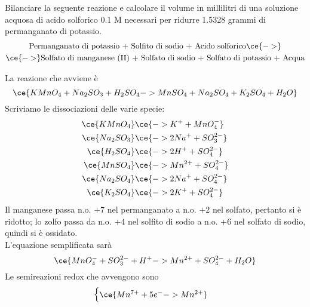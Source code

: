 \begin{esercizio}
    Bilanciare la seguente reazione e calcolare il volume in millilitri di una soluzione acquosa di acido solforico 0.1 M necessari per ridurre 1.5328 grammi di permanganato di potassio.
    \begin{gather*}
        \text{Permanganato di potassio + Solfito di sodio + Acido solforico} \ce{->}
        \\
        \ce{->} \text{Solfato di manganese (II) + Solfato di sodio + Solfato di potassio + Acqua}
    \end{gather*}
\end{esercizio}
\begin{soluzione}
    La reazione che avviene è
    \begin{equation*}
        \ce{KMnO_4 + Na_2SO_3 + H_2SO_4 -> MnSO_4 + Na_2SO_4 + K_2SO_4 + H_2O}
    \end{equation*}
    Scriviamo le dissociazioni delle varie specie:
    \begin{equation*}
        \begin{split}
            \ce{KMnO_4} & \ce{-> K^+ + MnO_4^-}
            \\
            \ce{Na_2SO_3} & \ce{-> 2Na^+ + SO_3^{2-}}
            \\
            \ce{H_2SO_4} & \ce{-> 2H^+ + SO_4^{2-}}
            \\
            \ce{MnSO_4} & \ce{-> Mn^{2+} + SO_4^{2-}}
            \\
            \ce{Na_2SO_4} & \ce{-> 2Na^+ + SO_4^{2-}}
            \\
            \ce{K_2SO_4} & \ce{-> 2K^+ + SO_4^{2-}}
            \\
        \end{split}
    \end{equation*}
    Il manganese passa n.o. $+7$ nel permanganato a n.o. $+2$ nel solfato, pertanto si è ridotto; lo zolfo passa da n.o. $+4$ nel solfito di sodio a n.o. $+6$ nel solfato di sodio, quindi si è ossidato.\\
    L'equazione semplificata sarà
    \begin{equation*}
        \ce{MnO_4^- + SO_3^{2-} + H^+ -> Mn^{2+} + SO_4^{2-} + H_2O}
    \end{equation*}
    Le semireazioni redox che avvengono sono
    \begin{equation*}
        \begin{cases}
            \ce{Mn^{7+} + 5e^- -> Mn^{2+}}\\

\end{cases}
\end{equation*}
\end{soluzione}
